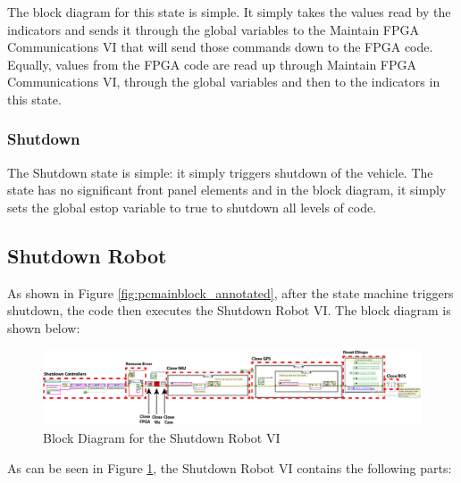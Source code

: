 \noindent The block diagram for this state is simple. It simply takes the values read by the indicators and sends it through the global variables to the Maintain FPGA Communications VI that will send those commands down to the FPGA code. Equally, values from the FPGA code are read up through Maintain FPGA Communications VI, through the global variables and then to the indicators in this state.

\subsubsection{Shutdown}

The Shutdown state is simple: it simply triggers shutdown of the vehicle. The state has no significant front panel elements and in the block diagram, it simply sets the global estop variable to true to shutdown all levels of code.

\subsection{Shutdown Robot}

As shown in Figure \ref{fig:pcmainblock_annotated}, after the state machine triggers shutdown, the code then executes the Shutdown Robot VI. The block diagram is shown below:

\begin{figure}[h!]
\centering
\includegraphics[scale=0.35]{Photos/ShutdownRobot_annotated.png}
\caption{Block Diagram for the Shutdown Robot VI}
\label{fig:shutdownrobot}
\end{figure}

\noindent As can be seen in Figure \ref{fig:shutdownrobot}, the Shutdown Robot VI contains the following parts:


